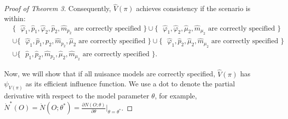\documentclass{article}
\newcommand{\wh}{\widehat}
\newcommand{\pk}{{\varphi}}
\begin{document}
\begin{proof}[Proof of Theorem 3]
Consequently, $\wh V(\pi)$ achieves consistency if the scenario is within:
	\begin{align*}
		&\{\text{ $\widehat{\pk}_1, \hat p_1, \widehat{\pk}_2, \hat p_2, \hat m_{p_2}$ are correctly specified }\}  
		\cup 
		 \{\text{ $\widehat{\pk}_1, \widehat{\pk}_2, \hat \mu_2, \hat m_{\mu_2}$ are correctly specified }\} \\
		&\cup
		 \{\text{ $\widehat{\pk}_1, \hat p_1, \hat p_2, \hat m_{p_2}, \hat \mu_2$ are correctly specified }\} 
		\cup
		 \{\text{ $\widehat{\pk}_1, \hat p_2, \hat \mu_2, \hat m_{\mu_2}$ are correctly specified }\} \\
		&\cup
		 \{\text{ $\hat p_1, \hat p_2, \hat m_{p_2}, \hat \mu_2, \hat m_{\mu_2}$ are correctly specified }\}.
	\end{align*}
	
Now, we will show that if all nuisance models are correctly specified, $\wh V(\pi)$ has $\psi_{V(\pi)}$ as its efficient influence function. We use a dot to denote the partial derivative with respect to the model parameter $\theta$, for example, $\dot N^*(O) = \dot N(O;\theta^*) = \frac{\partial N(O;\theta)}{\partial \theta} \Big|_{\theta=\theta^*}$.


\end{proof}
\end{document}
